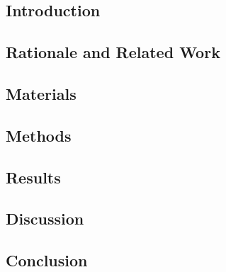 \subsection{Introduction}

\subsection{Rationale and Related Work}

\subsection{Materials}

\subsection{Methods}

\subsection{Results}

\subsection{Discussion}

\subsection{Conclusion}






